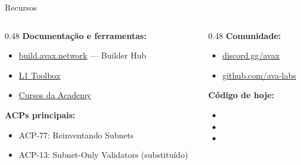 \documentclass[aspectratio=169]{beamer}
\begin{document}
\begin{frame}{Recursos}
	\begin{columns}[t]
		\begin{column}{0.48\textwidth}
			\textbf{Documentação e ferramentas:}
			\begin{itemize}
				\item \href{https://build.avax.network}{build.avax.network} — Builder Hub
				\item \href{https://build.avax.network/tools/l1-toolbox}{L1 Toolbox}
				\item \href{https://build.avax.network/academy}{Cursos da Academy}
			\end{itemize}

			\vspace{0.5em}
			\textbf{ACPs principais:}
			\begin{itemize}
				\item ACP-77: Reinventando Subnets
				\item ACP-13: Subnet-Only Validators (substituído)
			\end{itemize}
		\end{column}
		\begin{column}{0.48\textwidth}
			\textbf{Comunidade:}
			\begin{itemize}
				\item \href{https://discord.gg/avax}{discord.gg/avax}
				\item \href{https://github.com/ava-labs}{github.com/ava-labs}
			\end{itemize}

			\vspace{0.5em}
			\textbf{Código de hoje:}
			\begin{itemize}
				\item {}
				\item {}
				\item {}
			\end{itemize}
		\end{column}
	\end{columns}
\end{frame}
\end{document}
